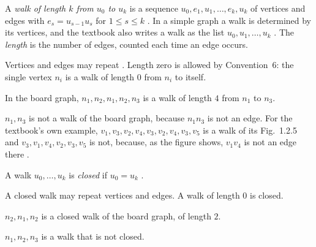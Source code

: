 \begin{definition}\label{def:walk}
A \emph{walk of length $k$ from $u_0$ to $u_k$} is a sequence $u_0,e_1,u_1,\dots,e_k,u_k$ of vertices and edges with $e_s=u_{s-1}u_s$ for $1\le s\le k$ \cite[Def.~1.2.10, p.~21]{petrosyan2015grafneri}. In a simple graph a walk is determined by its vertices, and the textbook also writes a walk as the list $u_0,u_1,\dots,u_k$ \cite[p.~21]{petrosyan2015grafneri}. The \emph{length} is the number of edges, counted each time an edge occurs.
\end{definition}
\begin{remark}
Vertices and edges may repeat \cite[p.~22]{petrosyan2015grafneri}. Length zero is allowed by Convention~6: the single vertex $n_i$ is a walk of length $0$ from $n_i$ to itself.
\end{remark}
\begin{example}
In the board graph, $n_1,n_2,n_1,n_2,n_3$ is a walk of length $4$ from $n_1$ to $n_3$.
\end{example}
\begin{nonexample}
$n_1,n_3$ is not a walk of the board graph, because $n_1n_3$ is not an edge. For the textbook's own example, $v_1,v_3,v_2,v_4,v_3,v_2,v_4,v_3,v_5$ is a walk of its Fig.~1.2.5 and $v_3,v_1,v_4,v_2,v_3,v_5$ is not, because, as the figure shows, $v_1v_4$ is not an edge there \cite[Fig.~1.2.5, p.~21]{petrosyan2015grafneri}.
\end{nonexample}

\begin{definition}\label{def:closedwalk}
A walk $u_0,\dots,u_k$ is \emph{closed} if $u_0=u_k$ \cite[Def.~1.2.11, p.~22]{petrosyan2015grafneri}.
\end{definition}
\begin{remark}
A closed walk may repeat vertices and edges. A walk of length $0$ is closed.
\end{remark}
\begin{example}
$n_2,n_1,n_2$ is a closed walk of the board graph, of length $2$.
\end{example}
\begin{nonexample}
$n_1,n_2,n_3$ is a walk that is not closed.
\end{nonexample}

